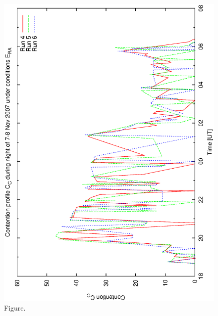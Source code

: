 \documentclass[12pt,a4paper]{article}
\begin{document}
\begin{figure}[htbp]
 \begin{center}
  \includegraphics[scale=1.0, angle=0]{figures/bsb_rnd2_cont.eps}
 \end{center}
  \caption[Figure.]
{Figure.}
\end{figure}
\clearpage
\end{document}
